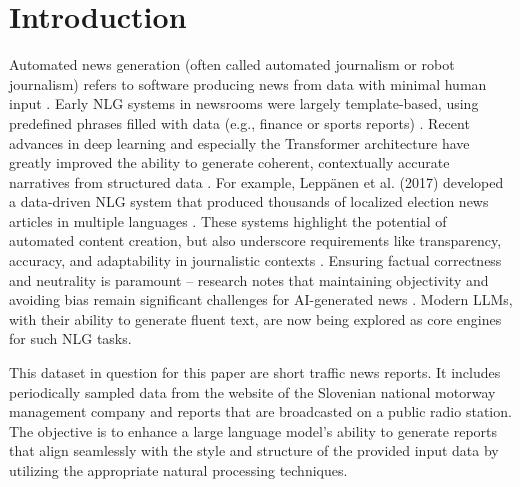 \section*{Introduction}

Automated news generation (often called automated journalism or robot journalism) refers to software producing news from data with minimal human input \cite{acl_anthology}.
Early NLG systems in newsrooms were largely template-based, using predefined phrases filled with data (e.g., finance or sports reports) \cite{acl_anthology}.
Recent advances in deep learning and especially the Transformer architecture have greatly improved the ability to generate coherent, contextually accurate narratives from structured data \cite{arxiv_transformer}.
For example, Leppänen et al. (2017) developed a data-driven NLG system that produced thousands of localized election news articles in multiple languages \cite{acl_anthology}.
These systems highlight the potential of automated content creation, but also underscore requirements like transparency, accuracy, and adaptability in journalistic contexts \cite{acl_anthology}.
Ensuring factual correctness and neutrality is paramount – research notes that maintaining objectivity and avoiding bias remain significant challenges for AI-generated news \cite{arxiv_bias}.
Modern LLMs, with their ability to generate fluent text, are now being explored as core engines for such NLG tasks.

This dataset in question for this paper are short traffic news reports.
It includes periodically sampled data from the website of the Slovenian national motorway management company and reports that are broadcasted on a public radio station.
The objective is to enhance a large language model's ability to generate reports that align seamlessly with the style and structure of the provided input data by utilizing the appropriate natural processing techniques.
